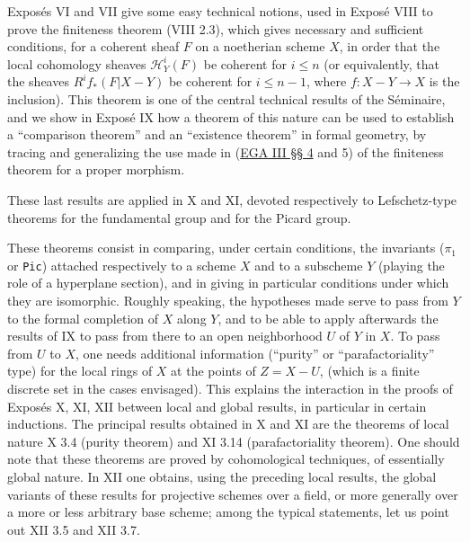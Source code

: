 \documentclass[
  11pt,
  a4paper,
]{book}
\begin{document}
Exposés VI and VII give some easy technical notions, used in Exposé VIII
to prove the finiteness theorem (VIII 2.3), which gives necessary and
sufficient conditions, for a coherent sheaf \(F\) on a noetherian scheme
\(X\), in order that the local cohomology sheaves
\(\mathcal{H}^{i}_{Y}(F)\) be coherent for \(i \leqslant n\) (or
equivalently, that the sheaves \(R^{i} f_{*}(F|X - Y)\) be coherent for
\(i \leqslant n - 1\), where \(f: X - Y \to X\) is the inclusion). This
theorem is one of the central technical results of the Séminaire, and we
show in Exposé IX how a theorem of this nature can be used to establish
a ``comparison theorem'' and an ``existence theorem'' in formal
geometry, by tracing and generalizing the use made in
(\href{https://jcreinhold.github.io/ega/iii/11-ch3-04-fundamental-theorem-proper-morphisms.html\#4-the-fundamental-theorem-of-proper-morphisms-applications}{EGA
III §§ 4} and 5) of the finiteness theorem for a proper morphism.

These last results are applied in X and XI, devoted respectively to
Lefschetz-type theorems for the fundamental group and for the Picard
group.

These theorems consist in comparing, under certain conditions, the
invariants (\(\pi_{1}\) or \texttt{Pic}) attached respectively to a
scheme \(X\) and to a subscheme \(Y\) (playing the role of a hyperplane
section), and in giving in particular conditions under which they are
isomorphic. Roughly speaking, the hypotheses made serve to pass from
\(Y\) to the formal completion of \(X\) along \(Y\), and to be able to
apply afterwards the results of IX to pass from there to an open
neighborhood \(U\) of \(Y\) in \(X\). To pass from \(U\) to \(X\), one
needs additional information (``purity'' or ``parafactoriality'' type)
for the local rings of \(X\) at the points of \(Z = X - U\), (which is a
finite discrete set in the cases envisaged). This explains the
interaction in the proofs of Exposés X, XI, XII between local and global
results, in particular in certain inductions. The principal results
obtained in X and XI are the theorems of local nature X 3.4 (purity
theorem) and XI 3.14 (parafactoriality theorem). One should note that
these theorems are proved by cohomological techniques, of essentially
global nature. In XII one obtains, using the preceding local results,
the global variants of these results for projective schemes over a
field, or more generally over a more or less arbitrary base scheme;
among the typical statements, let us point out XII 3.5 and XII 3.7.
\end{document}
